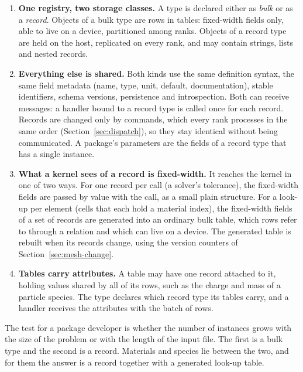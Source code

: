\documentclass[11pt,a4paper]{article}
\begin{document}
\begin{enumerate}
  \item \textbf{One registry, two storage classes.}  A type is declared
        either as \emph{bulk} or as a \emph{record}.  Objects of a bulk type
        are rows in tables: fixed-width fields only, able to live on a
        device, partitioned among ranks.  Objects of a record type are held
        on the host, replicated on every rank, and may contain strings,
        lists and nested records.
  \item \textbf{Everything else is shared.}  Both kinds use the same
        definition syntax, the same field metadata (name, type, unit,
        default, documentation), stable identifiers, schema versions,
        persistence and introspection.  Both can receive messages: a handler
        bound to a record type is called once for each record.  Records are
        changed only by commands, which every rank processes in the same
        order (Section~\ref{sec:dispatch}), so they stay identical without
        being communicated.  A package's parameters are the fields of a
        record type that has a single instance.
  \item \textbf{What a kernel sees of a record is fixed-width.}  It reaches
        the kernel in one of two ways.  For one record per call (a solver's
        tolerance), the fixed-width fields are passed by value with the
        call, as a small plain structure.  For a look-up per element (cells
        that each hold a material index), the fixed-width fields of a set of
        records are generated into an ordinary bulk table, which rows refer
        to through a relation and which can live on a device.  The generated
        table is rebuilt when its records change, using the version counters
        of Section~\ref{sec:mesh-change}.
  \item \textbf{Tables carry attributes.}  A table may have one record
        attached to it, holding values shared by all of its rows, such as
        the charge and mass of a particle species.  The type declares which
        record type its tables carry, and a handler receives the attributes
        with the batch of rows.
\end{enumerate}

The test for a package developer is whether the number of instances grows
with the size of the problem or with the length of the input file.  The
first is a bulk type and the second is a record.  Materials and species lie
between the two, and for them the answer is a record together with a
generated look-up table.
\end{document}
